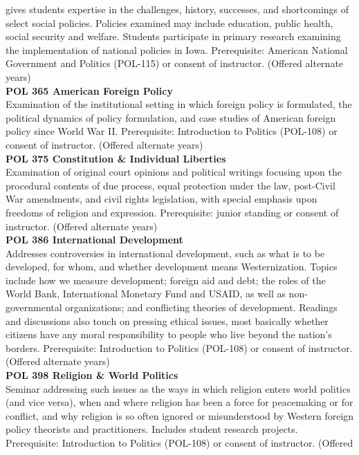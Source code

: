 \documentclass[
  letterpaper,
]{scrbook}
\begin{document}
gives students expertise in the challenges, history, successes, and
shortcomings of select social policies. Policies examined may include
education, public health, social security and welfare. Students
participate in primary research examining the implementation of national
policies in Iowa. Prerequisite: American National Government and
Politics (POL-115) or consent of instructor. (Offered alternate years)\\
\textbf{POL 365 American Foreign Policy}\\
Examination of the institutional setting in which foreign policy is
formulated, the political dynamics of policy formulation, and case
studies of American foreign policy since World War II. Prerequisite:
Introduction to Politics (POL-108) or consent of instructor. (Offered
alternate years)\\
\textbf{POL 375 Constitution \& Individual Liberties}\\
Examination of original court opinions and political writings focusing
upon the procedural contents of due process, equal protection under the
law, post-Civil War amendments, and civil rights legislation, with
special emphasis upon freedoms of religion and expression. Prerequisite:
junior standing or consent of instructor. (Offered alternate years)\\
\textbf{POL 386 International Development}\\
Addresses controversies in international development, such as what is to
be developed, for whom, and whether development means Westernization.
Topics include how we measure development; foreign aid and debt; the
roles of the World Bank, International Monetary Fund and USAID, as well
as non-governmental organizations; and conflicting theories of
development. Readings and discussions also touch on pressing ethical
issues, most basically whether citizens have any moral responsibility to
people who live beyond the nation's borders. Prerequisite: Introduction
to Politics (POL-108) or consent of instructor. (Offered alternate
years)\\
\textbf{POL 398 Religion \& World Politics}\\
Seminar addressing such issues as the ways in which religion enters
world politics (and vice versa), when and where religion has been a
force for peacemaking or for conflict, and why religion is so often
ignored or misunderstood by Western foreign policy theorists and
practitioners. Includes student research projects. Prerequisite:
Introduction to Politics (POL-108) or consent of instructor. (Offered
\end{document}

